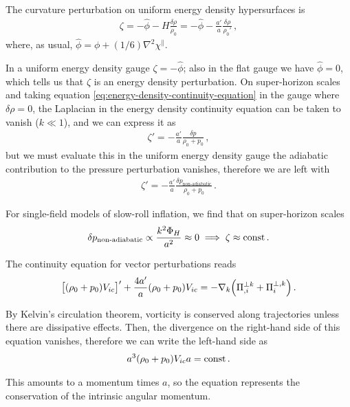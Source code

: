 \documentclass[main.tex]{subfiles}
\begin{document}
The curvature perturbation on uniform energy density hypersurfaces is 
%
\begin{align}
\zeta = - \hat{\phi} - H \frac{ \delta \rho }{\dot{\rho}_0 } = - \hat{\phi} - \frac{a'}{a} \frac{ \delta \rho }{\rho_0 '}
\,,
\end{align}
%
where, as usual, \(\hat{\phi} = \phi + (1/6) \nabla^2 \chi^{\parallel}\). 

In a uniform energy density gauge \(\zeta = - \hat{\phi}\); also in the flat gauge we have \(\hat{\phi} = 0\), which tells us that \(\zeta \) is an energy density perturbation. 
On super-horizon scales and taking equation \eqref{eq:energy-density-continuity-equation} in the gauge where \(\delta \rho = 0\), the Laplacian in the energy density continuity equation can be taken to vanish (\(k \ll 1\)), and we can express it as 
%
\begin{align}
\zeta ' = - \frac{a'}{a} \frac{ \delta p}{\rho_0 + p_0 }
\,,
\end{align}
%
but we must evaluate this in the uniform energy density gauge the adiabatic contribution to the pressure perturbation vanishes, therefore we are left with 
%
\begin{align}
\zeta ' = - \frac{a'}{a} \frac{ \delta p _{\text{non-adiabatic}}}{\rho_0 + p_0 }
\,.
\end{align}

For single-field models of slow-roll inflation, we find that on super-horizon scales
%
\begin{align}
\delta p _{\text{non-adiabatic}} \propto \frac{k^2 \Phi _H}{a^2} \approx 0 \implies \zeta \approx \text{const} 
\,.
\end{align}

The continuity equation for vector perturbations reads 
%
\begin{align}
\qty[(\rho_0 +p_0 ) V_{ic}]' + \frac{4 a'}{a} (\rho_0 + p_0 ) V_{ic} 
= - \nabla_k \qty(\Pi^{\perp k}_{, i} + \Pi^{\perp, k}_{i})
\,.
\end{align}

By Kelvin's circulation theorem, vorticity is conserved along trajectories unless there are dissipative effects.
Then, the divergence on the right-hand side of this equation vanishes, therefore we can write the left-hand side as 
%
\begin{align}
a^3 \qty(\rho_0 + p_0 ) V_{ic} a = \text{const}
\,.
\end{align}

This amounts to a momentum times \(a\), so the equation represents the conservation of the intrinsic angular momentum. 
\end{document}

